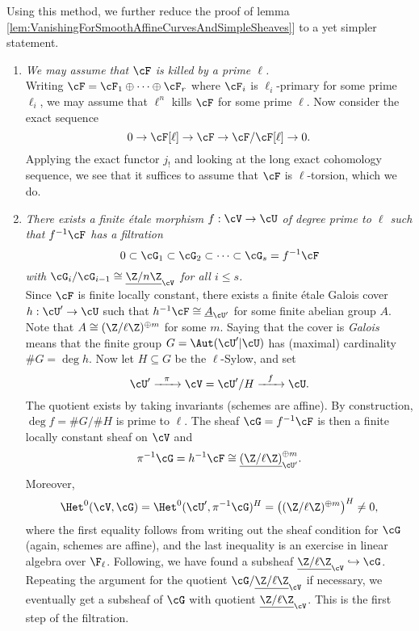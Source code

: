 Using this method, we further reduce the proof of lemma \ref{lem:VanishingForSmoothAffineCurvesAndSimpleSheaves}] to a yet simpler statement.
\begin{enumerate}[\it Step 1.]
\item
{\it We may assume that $\cF$ is killed by a prime $\ell$.}
\\
Writing $\cF = \cF_1 \oplus \cdots \oplus \cF_r$ where $\cF_i$ is $\ell_i$-primary for some prime $\ell_i$, we may assume that $\ell^n$ kills $\cF$ for some prime $\ell$. Now consider the exact sequence 
$$
0 \to \cF[\ell] \to \cF \to \cF/\cF[\ell] \to 0.
$$
Applying the exact functor $j_!$ and looking at the long exact cohomology sequence, we see that it suffices to assume that $\cF$ is $\ell$-torsion, which we do.
\item
{\it There exists a finite \'etale morphism $f: \cV \to \cU$ of degree prime to $\ell$ such that $f^{-1} \cF$ has a filtration
$$
0 \subset \cG_1 \subset \cG_2 \subset \cdots \subset \cG_s = f^{-1} \cF
$$
with $\cG_i /\cG_{i-1} \cong \underline{\Z/n\Z}_\cV$ for all $i \leqslant s$.}
\\
Since $\cF$ is finite locally constant, there exists a finite \'etale Galois cover $h : \cU' \to \cU$ such that $h^{-1} \cF \cong \underline{A}_{\cU'}$ for some finite abelian group $A$. Note that $A \cong (\Z/\ell\Z)^{\oplus m}$ for some $m$. Saying that the cover is \emph{Galois} means that the finite group $G = \Aut(\cU' | \cU)$ has (maximal) cardinality $\# G = \deg h$. Now let $H \subseteq G$ be the $\ell$-Sylow, and set
$$
\cU' \xrightarrow{\ \ \pi \ \ } \cV = \cU'/H \xrightarrow{\ \ f \ \ } \cU.
$$
The quotient exists by taking invariants (schemes are affine). By construction, $\deg f = \#G/\#H$ is prime to $\ell$. The sheaf $\cG = f^{-1} \cF$ is then a finite locally constant sheaf on $\cV$ and 
$$
\pi^{-1} \cG = h^{-1}\cF \cong \underline{(\Z/\ell\Z)}^{\oplus m}_{\cU'}.
$$
Moreover, 
$$
\Het^0(\cV, \cG) = \Het^0(\cU', \pi^{-1}\cG)^H = \left((\Z/\ell\Z)^{\oplus m}\right)^H \neq 0,
$$
where the first equality follows from writing out the sheaf condition for $\cG$ (again, schemes are affine), and the last inequality is an exercise in linear algebra over $\F_\ell$. Following, we have found a subsheaf $\underline{\Z/\ell\Z}_\cV \hookrightarrow \cG$. Repeating the argument for the quotient $\cG/ \underline{\Z/\ell\Z}_\cV$ if necessary, we eventually get a subsheaf of $\cG$ with quotient $\underline{\Z/\ell\Z}_\cV$. This is the first step of the filtration.


\end{enumerate}

